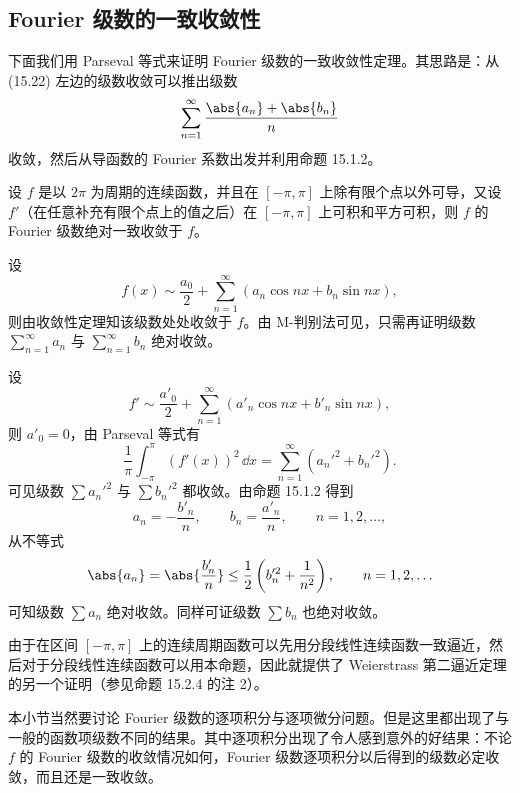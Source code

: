 \subsection{Fourier 级数的一致收敛性}

下面我们用 Parseval 等式来证明 Fourier 级数的一致收敛性定理。其思路是：从 (15.22) 左边的级数收敛可以推出级数
\[
  \sum_{n=1}^{\infty}\frac{\abs{a_n}+\abs{b_n}}{n}
\]
收敛，然后从导函数的 Fourier 系数出发并利用命题 15.1.2。

\begin{xproposition}[15.2.8]
设 $f$ 是以 $2\pi$ 为周期的连续函数，并且在 $[-\pi,\pi]$ 上除有限个点以外可导，又设 $f'$（在任意补充有限个点上的值之后）在 $[-\pi,\pi]$ 上可积和平方可积，则 $f$ 的 Fourier 级数绝对一致收敛于 $f$。
\end{xproposition}
\begin{xproof}
设
\[
  f(x)\sim\frac{a_0}{2}+\sum_{n=1}^{\infty}(a_n\cos nx+b_n\sin nx),
\]
则由收敛性定理知该级数处处收敛于 $f$。由 M-判别法可见，只需再证明级数 $\sum_{n=1}^{\infty}a_n$ 与 $\sum_{n=1}^{\infty}b_n$ 绝对收敛。

设
\[
  f'\sim\frac{a'_0}{2}+\sum_{n=1}^{\infty}(a'_n\cos nx+b'_n\sin nx),
\]
则 $a'_0=0$，由 Parseval 等式有
\[
  \frac1\pi\int_{-\pi}^{\pi}(f'(x))^2\,\dd x
  =\sum_{n=1}^{\infty}(a_n'^2+b_n'^2).
\]
可见级数 $\sum a_n'^2$ 与 $\sum b_n'^2$ 都收敛。由命题 15.1.2 得到
\[
  a_n=-\frac{b'_n}{n},\qquad b_n=\frac{a'_n}{n},\qquad n=1,2,\ldots,
\]
从不等式
\[
  \abs{a_n}=\abs{\frac{b'_n}{n}}\le\frac12\left(b_n'^2+\frac1{n^2}\right),\qquad n=1,2,\ldots
\]
可知级数 $\sum a_n$ 绝对收敛。同样可证级数 $\sum b_n$ 也绝对收敛。
\end{xproof}

\begin{xremark}
由于在区间 $[-\pi,\pi]$ 上的连续周期函数可以先用分段线性连续函数一致逼近，然后对于分段线性连续函数可以用本命题，因此就提供了 Weierstrass 第二逼近定理的另一个证明（参见命题 15.2.4 的注 2）。
\end{xremark}

本小节当然要讨论 Fourier 级数的逐项积分与逐项微分问题。但是这里都出现了与一般的函数项级数不同的结果。其中逐项积分出现了令人感到意外的好结果：不论 $f$ 的 Fourier 级数的收敛情况如何，Fourier 级数逐项积分以后得到的级数必定收敛，而且还是一致收敛。

